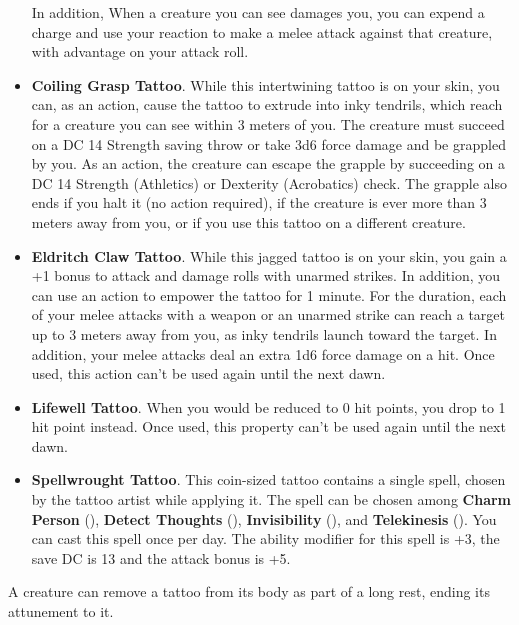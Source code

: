 \begin{itemize}
            In addition, When a creature you can see damages you, you can expend a charge and use your reaction to make a melee attack against that creature, with advantage on your attack roll.
        \item \textbf{Coiling Grasp Tattoo}.
            While this intertwining tattoo is on your skin, you can, as an action, cause the tattoo to extrude into inky tendrils, which reach for a creature you can see within 3 meters of you.
            The creature must succeed on a DC 14 Strength saving throw or take 3d6 force damage and be grappled by you.
            As an action, the creature can escape the grapple by succeeding on a DC 14 Strength (Athletics) or Dexterity (Acrobatics) check.
            The grapple also ends if you halt it (no action required), if the creature is ever more than 3 meters away from you, or if you use this tattoo on a different creature.
        \item \textbf{Eldritch Claw Tattoo}.
            While this jagged tattoo is on your skin, you gain a +1 bonus to attack and damage rolls with unarmed strikes.
            In addition, you can use an action to empower the tattoo for 1 minute.
            For the duration, each of your melee attacks with a weapon or an unarmed strike can reach a target up to 3 meters away from you, as inky tendrils launch toward the target.
            In addition, your melee attacks deal an extra 1d6 force damage on a hit.
            Once used, this action can't be used again until the next dawn.
        \item \textbf{Lifewell Tattoo}.
            When you would be reduced to 0 hit points, you drop to 1 hit point instead.
            Once used, this property can't be used again until the next dawn.
        \item \textbf{Spellwrought Tattoo}.
            This coin-sized tattoo contains a single spell, chosen by the tattoo artist while applying it.
            The spell can be chosen among \textbf{Charm Person} (\pageref{spell::charmperson}), \textbf{Detect Thoughts} (\pageref{spell::detectthoughts}), \textbf{Invisibility} (\pageref{spell::invisibility}), and \textbf{Telekinesis} (\pageref{spell::telekinesis}).
            You can cast this spell once per day.
            The ability modifier for this spell is +3, the save DC is 13 and the attack bonus is +5.
    \end{itemize}

    A creature can remove a tattoo from its body as part of a long rest, ending its attunement to it.
